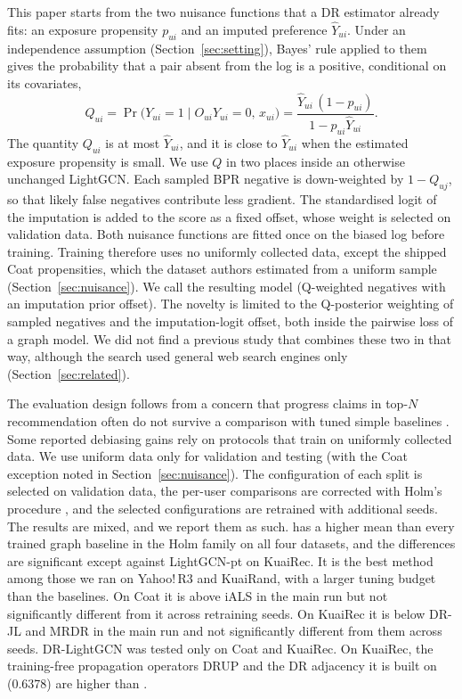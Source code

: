 This paper starts from the two nuisance functions that a DR estimator already fits:
an exposure propensity $p_{ui}$ and an imputed preference $\hat Y_{ui}$. Under an independence
assumption (Section~\ref{sec:setting}), Bayes' rule applied to them gives the
probability that a pair absent from the log is a positive, conditional on its covariates,
\begin{equation}\label{eq:Q}
Q_{ui}=\Pr\bigl(Y_{ui}=1\mid O_{ui}Y_{ui}=0,\,x_{ui}\bigr)
=\frac{\hat Y_{ui}\,(1-p_{ui})}{1-p_{ui}\hat Y_{ui}}.
\end{equation}
The quantity $Q_{ui}$ is at most $\hat Y_{ui}$, and it is close to $\hat Y_{ui}$ when
the estimated exposure propensity is small. We use $Q$ in two places inside an otherwise unchanged LightGCN.
Each sampled BPR negative is down-weighted by $1-Q_{uj}$, so that likely false
negatives contribute less gradient. The standardised logit of the imputation is
added to the score as a fixed offset, whose weight is selected on validation data.
Both nuisance functions are fitted once on the biased log before training. Training
therefore uses no uniformly collected data, except the shipped Coat propensities, which the dataset authors estimated from a uniform sample (Section~\ref{sec:nuisance}). We call the resulting model \qp{}
(Q-weighted negatives with an imputation prior offset). The novelty is limited to the Q-posterior weighting of sampled negatives and the imputation-logit offset, both inside the pairwise loss of a graph model. We did not find a previous study that combines these two in that way, although the search used general web search engines only (Section~\ref{sec:related}).

The evaluation design follows from a concern that progress claims in top-$N$
recommendation often do not survive a comparison with tuned simple baselines
\citep{dacrema2019progress,rendle2019baselines,anelli2023myth}. Some reported
debiasing gains rely on protocols that train on uniformly collected data. We use uniform data only for validation and testing (with the Coat exception noted in Section~\ref{sec:nuisance}). The
configuration of each split is selected on validation data, the per-user comparisons
are corrected with Holm's procedure \citep{holm1979}, and the selected configurations
are retrained with additional seeds. The results are mixed, and we report them as
such. \qp{} has a higher mean than every trained graph baseline in the Holm family on all four datasets, and the differences are significant except against LightGCN-pt on KuaiRec. It is the best method among those we ran on Yahoo!\,R3 and KuaiRand, with a larger tuning budget than the baselines.
On Coat it is above iALS in the main run but not significantly different from it across
retraining seeds. On KuaiRec it is below DR-JL and MRDR in the main run and not significantly
different from them across seeds. DR-LightGCN was tested only on Coat and KuaiRec. On KuaiRec, the
training-free propagation operators DRUP and the DR adjacency it is built on (0.6378) are higher than \qp{}.


